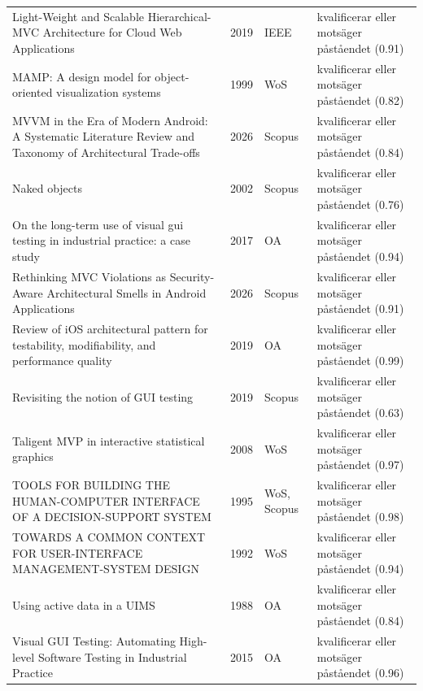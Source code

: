 \begin{longtable}{@{}%
  >{\raggedright\arraybackslash}p{}c%
  >{\raggedright\arraybackslash}p{}%
  >{\raggedright\arraybackslash}p{}@{}}
Light-Weight and Scalable Hierarchical-MVC Architecture for Cloud Web Applications & 2019 & IEEE & kvalificerar eller motsäger påståendet (0.91) \\
MAMP: A design model for object-oriented visualization systems & 1999 & WoS & kvalificerar eller motsäger påståendet (0.82) \\
MVVM in the Era of Modern Android: A Systematic Literature Review and Taxonomy of Architectural Trade-offs & 2026 & Scopus & kvalificerar eller motsäger påståendet (0.84) \\
Naked objects & 2002 & Scopus & kvalificerar eller motsäger påståendet (0.76) \\
On the long-term use of visual gui testing in industrial practice: a case study & 2017 & OA & kvalificerar eller motsäger påståendet (0.94) \\
Rethinking MVC Violations as Security-Aware Architectural Smells in Android Applications & 2026 & Scopus & kvalificerar eller motsäger påståendet (0.91) \\
Review of iOS architectural pattern for testability, modifiability, and performance quality & 2019 & OA & kvalificerar eller motsäger påståendet (0.99) \\
Revisiting the notion of GUI testing & 2019 & Scopus & kvalificerar eller motsäger påståendet (0.63) \\
Taligent MVP in interactive statistical graphics & 2008 & WoS & kvalificerar eller motsäger påståendet (0.97) \\
TOOLS FOR BUILDING THE HUMAN-COMPUTER INTERFACE OF A DECISION-SUPPORT SYSTEM & 1995 & WoS, Scopus & kvalificerar eller motsäger påståendet (0.98) \\
TOWARDS A COMMON CONTEXT FOR USER-INTERFACE MANAGEMENT-SYSTEM DESIGN & 1992 & WoS & kvalificerar eller motsäger påståendet (0.94) \\
Using active data in a UIMS & 1988 & OA & kvalificerar eller motsäger påståendet (0.84) \\
Visual GUI Testing: Automating High-level Software Testing in Industrial Practice & 2015 & OA & kvalificerar eller motsäger påståendet (0.96) \\
\end{longtable}
\endgroup
